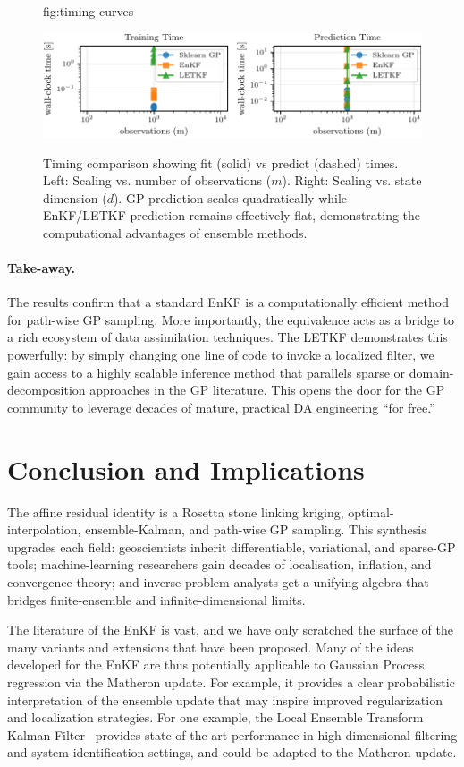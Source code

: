 \documentclass[wcp]{jmlr} %
\begin{document}
\begin{figure}[t]
  \floatconts
    {fig:timing-curves} %
    {\caption{Timing comparison showing fit (solid) vs predict (dashed) times. Left: Scaling vs. number of observations ($m$). Right: Scaling vs. state dimension ($d$). GP prediction scales quadratically while EnKF/LETKF prediction remains effectively flat, demonstrating the computational advantages of ensemble methods.}} %
    {\centering\includegraphics[width=\linewidth]{timing_vs_observations.pdf}}
\end{figure}

\paragraph{Take-away.}
The results confirm that a standard EnKF is a computationally efficient method for path-wise GP sampling. More importantly, the equivalence acts as a bridge to a rich ecosystem of data assimilation techniques. The LETKF demonstrates this powerfully: by simply changing one line of code to invoke a localized filter, we gain access to a highly scalable inference method that parallels sparse or domain-decomposition approaches in the GP literature. This opens the door for the GP community to leverage decades of mature, practical DA engineering ``for free.''



\section{Conclusion and Implications}

The affine residual identity is a Rosetta stone linking kriging, optimal-interpolation, ensemble-Kalman, and path-wise GP sampling. This synthesis upgrades each field: geoscientists inherit differentiable, variational, and sparse-GP tools; machine-learning researchers gain decades of localisation, inflation, and convergence theory; and inverse-problem analysts get a unifying algebra that bridges finite-ensemble and infinite-dimensional limits.

The literature of the EnKF is vast, and we have only scratched the surface of the many variants and extensions that have been proposed.
Many of the ideas developed for the EnKF are thus potentially applicable to Gaussian Process regression via the Matheron update.
For example, it provides a clear probabilistic interpretation of the ensemble update that may inspire improved regularization and localization strategies.
For one example, the Local Ensemble Transform Kalman Filter~\citep{Bocquet2020Online} provides state-of-the-art performance in high-dimensional filtering and system identification settings, and could be adapted to the Matheron update.
\end{document}
